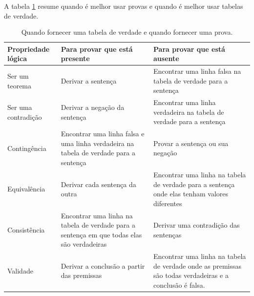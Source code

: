A tabela \ref{table.ProofOrModel} resume quando é melhor usar provas e quando é melhor usar tabelas de verdade. 

\begin{table}[H]\scriptsize
\setlength{\extrarowheight}{1ex}
\begin{tabular}{>{\centering\arraybackslash}p{}||p{}|p{}}
\hline
\textbf{Propriedade lógica} &
\textbf{Para provar que está presente} &
\textbf{Para provar que está ausente} \\
\hline\hline

Ser um teorema &
Derivar a sentença &
Encontrar uma linha falsa na tabela de verdade para a sentença \\
\hline

Ser uma contradição &
Derivar a negação da sentença &
Encontrar uma linha verdadeira na tabela de verdade para a sentença \\
\hline

Contingência &
Encontrar uma linha falsa e uma linha verdadeira na tabela de verdade para a sentença &
Provar a sentença ou sua negação \\
\hline

Equivalência &
Derivar cada sentença da outra &
Encontrar uma linha na tabela de verdade para a sentença onde elas tenham valores diferentes \\
\hline

Consistência &
Encontrar uma linha na tabela de verdade para a sentença em que todas elas são verdadeiras &
Derivar uma contradição das sentenças \\
\hline

Validade &
Derivar a conclusão a partir das premissas &
Encontrar uma linha na tabela de verdade onde as premissas são todas verdadeiras e a conclusão é falsa. \\
\hline
\end{tabular}
\caption{Quando fornecer uma tabela de verdade e quando fornecer uma prova.}
\label{table.ProofOrModel}
\end{table}

 
